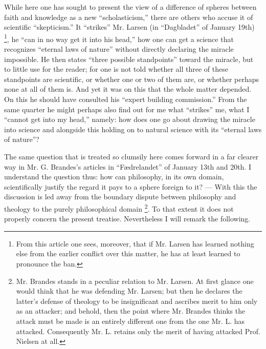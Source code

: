 \documentclass[12pt,a4paper]{book}
\newcommand{\opage}[1]{\marginnote{\footnotesize\textit{[#1]}}}
\begin{document}
While here one has sought to present the view of
a difference of spheres between faith and knowledge as a new ``scholasticism,''
there are others who accuse it of scientific
``skepticism.'' It ``strikes'' Mr. Larsen (in ``Dagbladet''
of January 19th)%
\footnote{From this article one sees, moreover, that if Mr. Larsen has learned nothing else from
the earlier conflict over this matter, he has at least learned to
pronounce the ban.}, he ``can in no way get it into
his head,'' how one can get a science that recognizes
\opage{45}\setcounter{footnote}{0}%
``eternal laws of nature'' without directly declaring the miracle
impossible. He then states ``three possible standpoints'' toward
the miracle, but to little use for the reader; for one is not told
whether all three of these standpoints are scientific, or
whether one or two of them are, or whether perhaps none at all of
them is. And yet it was on this that the whole matter depended. On this
he should have consulted his ``expert building commission.''
From the same quarter he might perhaps also find out for me what
``strikes'' me, what I ``cannot get into my head,''
namely: how does one go about drawing the miracle
into science and alongside this holding on to natural science
with its ``eternal laws of nature''?

The same question that is treated so clumsily here
comes forward in a far clearer way in Mr. G.
Brandes's articles in ``Fædrelandet'' of January 13th and 20th.
I understand the question thus: how can philosophy,
in its own domain, scientifically justify the
regard it pays to a sphere foreign to it? --- With this
the discussion is led away from the boundary dispute between philosophy
and theology to the purely philosophical domain%
\footnote{Mr. Brandes stands in a peculiar relation to Mr. Larsen. At first
glance one would think that he was defending Mr. Larsen; but then he declares
the latter's defense of theology to be insignificant and
ascribes merit to him only as an attacker; and behold, then the point
where Mr. Brandes thinks the attack must be made is an entirely different one
from the one Mr. L. has attacked. Consequently Mr. L. retains only
the merit of having attacked Prof. Nielsen at all.}.
To that extent it does not properly concern the present treatise.
Nevertheless I will remark the following.
\end{document}
